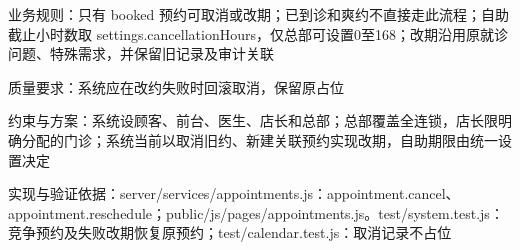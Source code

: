 \documentclass[UTF8,12pt,a4paper,fontset=none]{ctexart}
\begin{document}
业务规则：只有 booked 预约可取消或改期；已到诊和爽约不直接走此流程；自助截止小时数取 settings.\allowbreak{}cancellationHours，仅总部可设置0至168；改期沿用原就诊问题、特殊需求，并保留旧记录及审计关联\par
质量要求：系统应在改约失败时回滚取消，保留原占位\par
约束与方案：系统设顾客、前台、医生、店长和总部；总部覆盖全连锁，店长限明确分配的门诊；系统当前以取消旧约、新建关联预约实现改期，自助期限由统一设置决定\par
实现与验证依据：server/\allowbreak{}services/\allowbreak{}appointments.\allowbreak{}js：appointment.\allowbreak{}cancel、appointment.\allowbreak{}reschedule；public/\allowbreak{}js/\allowbreak{}pages/\allowbreak{}appointments.\allowbreak{}js。test/\allowbreak{}system.\allowbreak{}test.\allowbreak{}js：竞争预约及失败改期恢复原预约；test/\allowbreak{}calendar.\allowbreak{}test.\allowbreak{}js：取消记录不占位\par
{}
\end{document}
